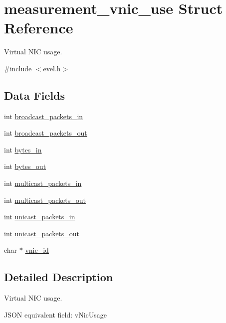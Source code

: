 \hypertarget{structmeasurement__vnic__use}{}\section{measurement\+\_\+vnic\+\_\+use Struct Reference}
\label{structmeasurement__vnic__use}


Virtual N\+I\+C usage.  




{\ttfamily \#include $<$evel.\+h$>$}

\subsection*{Data Fields}
\begin{DoxyCompactItemize}
\item 
int \hyperlink{structmeasurement__vnic__use_a76118fde6433600cb7114a69fbfd024f}{broadcast\+\_\+packets\+\_\+in}
\item 
int \hyperlink{structmeasurement__vnic__use_ab43fc257b8a2992991d20781f8e21ba9}{broadcast\+\_\+packets\+\_\+out}
\item 
int \hyperlink{structmeasurement__vnic__use_ad6289ea98d480dfc89aff65304ac665c}{bytes\+\_\+in}
\item 
int \hyperlink{structmeasurement__vnic__use_a3531ca46c61940621cea0f4d34f58855}{bytes\+\_\+out}
\item 
int \hyperlink{structmeasurement__vnic__use_af469a84518524df99c6b524aa354521e}{multicast\+\_\+packets\+\_\+in}
\item 
int \hyperlink{structmeasurement__vnic__use_a58b4b8efe4751047d156bb0df424b4c5}{multicast\+\_\+packets\+\_\+out}
\item 
int \hyperlink{structmeasurement__vnic__use_a674d1200ae67a951e79887bda5f4d48e}{unicast\+\_\+packets\+\_\+in}
\item 
int \hyperlink{structmeasurement__vnic__use_a2d57335948323764d13a286b46b6b53d}{unicast\+\_\+packets\+\_\+out}
\item 
char $\ast$ \hyperlink{structmeasurement__vnic__use_a2fd8f65f55f741c4c032ba2e6bda2da9}{vnic\+\_\+id}
\end{DoxyCompactItemize}


\subsection{Detailed Description}
Virtual N\+I\+C usage. 

J\+S\+O\+N equivalent field\+: v\+Nic\+Usage 

